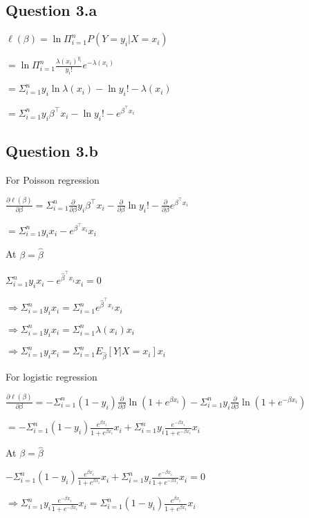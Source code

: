 \documentclass[
]{article}
\begin{document}
\hypertarget{question-3.a}{%
\subsection{Question 3.a}\label{question-3.a}}

\(\ell(\beta) = \ln\Pi_{i=1}^n P(Y=y_i|X=x_i)\)

\(=\ln\Pi_{i=1}^n \frac{\lambda(x_i)^{y_i}}{y_i!}e^{-\lambda(x_i)}\)

\(=\Sigma_{i=1}^n y_i\ln\lambda(x_i) -\ln y_i! -\lambda(x_i)\)

\(=\Sigma_{i=1}^n y_i\beta^\top x_i -\ln y_i! - e^{\beta^\top x_i}\)

\hypertarget{question-3.b}{%
\subsection{Question 3.b}\label{question-3.b}}

For Poisson regression

\(\frac{\partial\ell(\beta)}{\partial\beta}=\Sigma_{i=1}^n\frac{\partial}{\partial\beta}y_i\beta^\top x_i-\frac{\partial}{\partial\beta}\ln y_i!-\frac{\partial}{\partial\beta}e^{\beta^\top x_i}\)

\(=\Sigma_{i=1}^ny_ix_i-e^{\beta^\top x_i}x_i\)

At \(\beta=\hat\beta\)

\(\Sigma_{i=1}^ny_ix_i-e^{\hat\beta^\top x_i}x_i=0\)

\(\Rightarrow \Sigma_{i=1}^ny_ix_i=\Sigma_{i=1}^ne^{\hat\beta^\top x_i}x_i\)

\(\Rightarrow \Sigma_{i=1}^ny_ix_i=\Sigma_{i=1}^n\lambda(x_i)x_i\)

\(\Rightarrow \Sigma_{i=1}^ny_ix_i=\Sigma_{i=1}^nE_{\hat\beta}[Y|X=x_i]x_i\)

For logistic regression

\(\frac{\partial\ell(\beta)}{\partial\beta}=-\Sigma_{i=1}^n(1-y_i)\frac{\partial}{\partial\beta}\ln(1+e^{\beta x_i})-\Sigma_{i=1}^ny_i\frac{\partial}{\partial\beta}\ln(1+e^{-\beta x_i})\)

\(=-\Sigma_{i=1}^n(1-y_i)\frac{e^{\beta x_i}}{1+e^{\beta x_i}}x_i+\Sigma_{i=1}^ny_i\frac{e^{-\beta x_i}}{1+e^{-\beta x_i}}x_i\)

At \(\beta=\hat\beta\)

\(-\Sigma_{i=1}^n(1-y_i)\frac{e^{\beta x_i}}{1+e^{\beta x_i}}x_i+\Sigma_{i=1}^ny_i\frac{e^{-\beta x_i}}{1+e^{-\beta x_i}}x_i=0\)

\(\Rightarrow \Sigma_{i=1}^ny_i\frac{e^{-\beta x_i}}{1+e^{-\beta x_i}}x_i=\Sigma_{i=1}^n(1-y_i)\frac{e^{\beta x_i}}{1+e^{\beta x_i}}x_i\)
\end{document}
